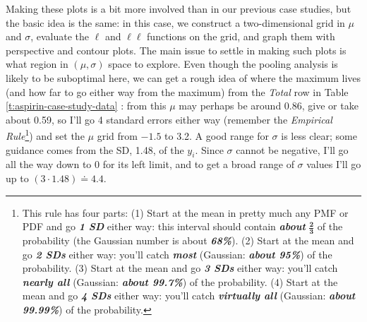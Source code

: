 \documentclass[12pt]{article}
\begin{document}
Making these plots is a bit more involved than in our previous case studies, but the basic idea is the same: in this case, we construct a two-dimensional grid in $\mu$ and $\sigma$, evaluate the $\ell$ and $\ell \ell$ functions on the grid, and graph them with perspective and contour plots. The main issue to settle in making such plots is what region in $( \mu, \sigma )$ space to explore. Even  though the pooling analysis is likely to be suboptimal here, we can get a rough idea of where the maximum lives (and how far to go either way from the maximum) from the \textit{Total} row in Table \ref{t:aspirin-case-study-data} : from this $\mu$ may perhaps be around 0.86, give or take about 0.59, so I'll go 4 standard errors either way (remember the \textit{Empirical Rule}\footnote{This rule has four parts: (1) Start at the mean in pretty much any PMF or PDF and go \textit{\textbf{1 SD}} either way: this interval should contain \textit{\textbf{about}} $\bm{ \frac{ 2 }{ 3 } }$ of the probability
(the Gaussian number is about \textit{\textbf{68\%}}). (2) Start at the mean and go \textit{\textbf{2 SDs}} either way: you'll catch \textbf{\textit{most}} (Gaussian: \textit{\textbf{about 95\%}}) of the probability. (3) Start at the mean and go \textit{\textbf{3 SDs}} either way: you'll catch \textbf{\textit{nearly all}} (Gaussian: \textit{\textbf{about 99.7\%}}) of the probability. (4) Start at the mean and go \textit{\textbf{4 SDs}} either way: you'll catch \textbf{\textit{virtually all}} (Gaussian: \textit{\textbf{about 99.99\%}}) of the probability.}) and set the $\mu$ grid from $-1.5$ to 3.2. A good range for $\sigma$ is less clear; some guidance comes from the SD, 1.48, of the $y_i$. Since $\sigma$ cannot be negative, I'll go all the way down to 0 for its left limit, and to get a broad range of $\sigma$ values I'll go up to $( 3 \cdot 1.48 ) \doteq 4.4$.
\end{document}
